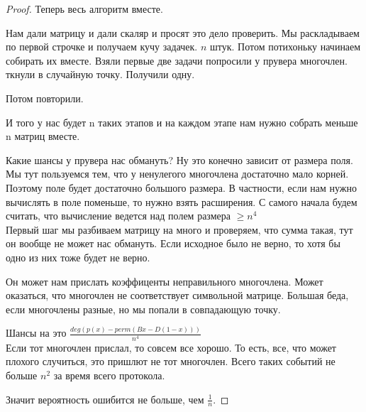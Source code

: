 \begin{proof}
Теперь весь алгоритм вместе. 

Нам дали матрицу и дали скаляр и просят это дело проверить. Мы раскладываем 
по первой строчке и получаем кучу задачек. $n$ штук. Потом потихоньку начинаем
собирать их вместе. Взяли первые две задачи попросили у прувера многочлен.
ткнули в случайную точку. Получили одну.

Потом повторили.

И того у нас будет n таких этапов и на каждом этапе нам нужно собрать
меньше n матриц вместе.

Какие шансы у прувера нас обмануть? Ну это
конечно зависит от размера поля. Мы тут пользуемся тем, что
у ненулегого многочлена достаточно мало корней. Поэтому поле будет
достаточно большого размера. В частности, если нам нужно вычислять в поле
поменьше, то нужно взять расширения. С самого начала будем считать, что
вычисление ведется над полем размера $\ge n^4$\\

Первый шаг мы разбиваем матрицу на много и проверяем, что 
сумма такая, тут он вообще не может нас обмануть. Если исходное 
было не верно, то хотя бы одно из них тоже будет не верно. 

Он может нам прислать коэффиценты неправильного многочлена. Может 
оказаться, что многочлен не соответствует символьной матрице. Большая
беда, если многочлены разные, но мы попали в совпадающую точку.

Шансы на это $\frac{deg(p(x) - perm(Bx - D(1 - x)))}{n^4}$\\

Если тот многочлен прислал, то совсем все хорошо. То есть, все, что может
плохого случиться, это пришлют не тот многочлен. Всего таких событий не
больше $n^2$  за время всего протокола.

Значит вероятность ошибится не больше, чем $\frac{1}{n}$. 
        
\end{proof}

